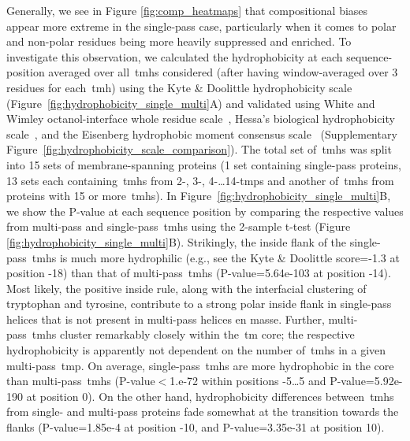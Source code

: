Generally, we see in Figure \ref{fig:comp_heatmaps} that compositional biases appear more extreme in the single-pass case, particularly when it comes to polar and non-polar residues being more heavily suppressed and enriched.
To investigate this observation, we calculated the hydrophobicity at each sequence-position averaged over all~\gls{tmh}s considered (after having window-averaged over 3 residues for each~\gls{tmh}) using the Kyte \& Doolittle hydrophobicity scale~\cite{Kyte1982} (Figure~\ref{fig:hydrophobicity_single_multi}A) and validated using White and Wimley octanol-interface whole residue scale~\cite{White1999}, Hessa’s biological hydrophobicity scale~\cite{Hessa2005}, and the Eisenberg hydrophobic moment consensus scale~\cite{Eisenberg1984} (Supplementary Figure~\ref{fig:hydrophobicity_scale_comparison}).
The total set of~\gls{tmh}s was split into 15 sets of membrane-spanning proteins (1 set containing single-pass proteins, 13 sets each containing~\gls{tmh}s from 2-, 3-, 4-\ldots 14-\gls{tmp}s and another of~\gls{tmh}s from proteins with 15 or more~\gls{tmh}s).
In Figure~\ref{fig:hydrophobicity_single_multi}B, we show the P-value at each sequence position by comparing the respective values from multi-pass and single-pass~\gls{tmh}s using the 2-sample t-test (Figure \ref{fig:hydrophobicity_single_multi}B).
Strikingly, the inside flank of the single-pass~\gls{tmh}s is much more hydrophilic (e.g., see the Kyte \& Doolittle score=-1.3 at position -18) than that of multi-pass~\gls{tmh}s (P-value=5.64e-103 at position -14).
Most likely, the positive inside rule, along with the interfacial clustering of tryptophan and tyrosine, contribute to a strong polar inside flank in single-pass helices that is not present in multi-pass helices en masse.
Further, multi-pass~\gls{tmh}s cluster remarkably closely within the~\gls{tm} core; the respective hydrophobicity is apparently not dependent on the number of~\gls{tmh}s in a given multi-pass~\gls{tmp}.
On average, single-pass~\gls{tmh}s are more hydrophobic in the core than multi-pass~\gls{tmh}s (P-value$<$1.e-72 within positions -5…5 and P-value=5.92e-190 at position 0).
On the other hand, hydrophobicity differences between~\gls{tmh}s from single- and multi-pass proteins fade somewhat at the transition towards the flanks (P-value=1.85e-4 at position -10, and P-value=3.35e-31 at position 10).

